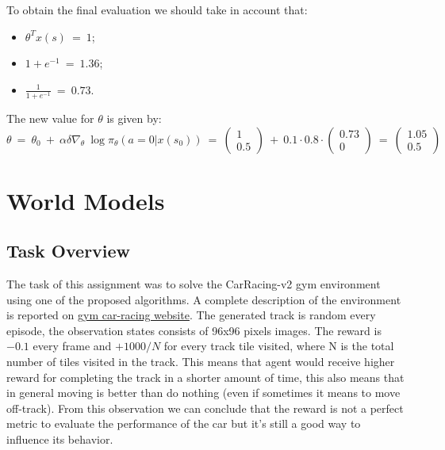 \documentclass[10pt,a4paper]{article}
\begin{document}
\noindent To obtain the final evaluation we should take in account that:
\begin{itemize}
    \item $\theta^{T} x(s) \:=\: 1$;
    \item $1+e^{-1} \:=\: 1.36$;
    \item $\frac{1}{1+e^{-1}} \:=\: 0.73$.
\end{itemize}
The new value for $\theta$ is given by:
\begin{equation*}
    \theta \:=\: \theta_0 \:+\: \alpha \delta \nabla_{\theta} \:\log \pi_{\theta} (a=0 | x(s_0))
    \:=\: \begin{pmatrix} 1 \\ 0.5 \end{pmatrix} \:+\: 0.1 \cdot 0.8 \cdot \begin{pmatrix} 0.73 \\ 0 \end{pmatrix} \:=\: \begin{pmatrix} 1.05 \\ 0.5 \end{pmatrix} 
\end{equation*}
\newpage 

\section{World Models}
 
\subsection{Task Overview}
The task of this assignment was to solve the CarRacing-v2 gym environment using one of the proposed algorithms. A complete description of the environment is reported on \href{https://www.gymlibrary.dev/environments/box2d/car_racing/}{\underline{gym  car-racing website}}. The generated track is random every episode, the observation states consists of 96x96 pixels images. The reward is $-0.1$ every frame and $+1000/N$ for every track tile visited, where N is the total number of tiles visited in the track. This means that agent would receive higher reward for completing the track in a shorter amount of time, this also means that in general moving is better than do nothing (even if sometimes it means to move off-track). From this observation we can conclude that the reward is not a perfect metric to evaluate the performance of the car but it's still a good way to influence its behavior. 
\end{document}

